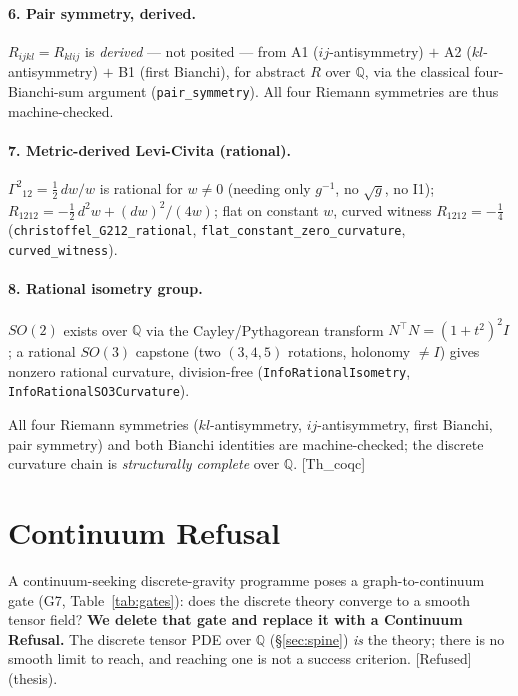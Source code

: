\documentclass[10pt,twocolumn]{article}
\theoremstyle{definition}
\newcommand{\Thq}{\textsf{[Th\_coqc]}}
\newcommand{\Refu}{\textsf{[Refused]}}
\newcommand{\code}[1]{\texttt{#1}}
\begin{document}
\paragraph{6. Pair symmetry, derived.} $R_{ijkl}=R_{klij}$ is \emph{derived} --- not
posited --- from A1 ($ij$-antisymmetry) $+$ A2 ($kl$-antisymmetry) $+$ B1 (first Bianchi),
for abstract $R$ over $\mathbb{Q}$, via the classical four-Bianchi-sum argument
(\code{pair\_symmetry}). All four Riemann symmetries are thus machine-checked.

\paragraph{7. Metric-derived Levi-Civita (rational).} $\Gamma^{2}{}_{12}=\tfrac12\,dw/w$ is
rational for $w\ne 0$ (needing only $g^{-1}$, no $\sqrt{g}$, no I1); $R_{1212} = -\tfrac12\,
d^2 w + (dw)^2/(4w)$; flat on constant $w$, curved witness $R_{1212}=-\tfrac14$
(\code{christoffel\_G212\_rational}, \code{flat\_constant\_zero\_curvature},
\code{curved\_witness}).

\paragraph{8. Rational isometry group.} $SO(2)$ exists over $\mathbb{Q}$ via the
Cayley/Pythagorean transform \cite{cayley1846} $N^{\!\top}N=(1+t^2)^2 I$; a rational $SO(3)$ capstone (two
$(3,4,5)$ rotations, holonomy $\ne I$) gives nonzero rational curvature, division-free
(\code{InfoRationalIsometry}, \code{InfoRationalSO3Curvature}).

All four Riemann symmetries ($kl$-antisymmetry, $ij$-antisymmetry, first Bianchi, pair
symmetry) and both Bianchi identities are machine-checked; the discrete curvature chain is
\emph{structurally complete} over $\mathbb{Q}$. \Thq{}

\section{Continuum Refusal}\label{sec:refusal}

A continuum-seeking discrete-gravity programme poses a graph-to-continuum gate (G7,
Table~\ref{tab:gates}): does the discrete theory converge to a smooth tensor field? \textbf{We
delete that gate and replace it with a Continuum Refusal.} The discrete tensor PDE over
$\mathbb{Q}$ (\S\ref{sec:spine}) \emph{is} the theory; there is no smooth limit to reach, and
reaching one is not a success criterion. \Refu{} (thesis).
\end{document}
